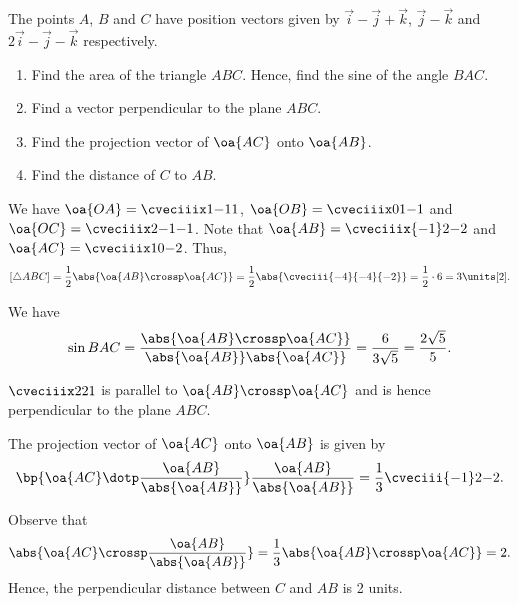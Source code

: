 \clearpage
\begin{problem}
    The points $A$, $B$ and $C$ have position vectors given by $\vec i - \vec j + \vec k$, $\vec j - \vec k$ and $2 \vec i - \vec j - \vec k$ respectively.

    \begin{enumerate}
        \item Find the area of the triangle $ABC$. Hence, find the sine of the angle $BAC$.
        \item Find a vector perpendicular to the plane $ABC$.
        \item Find the projection vector of $\oa{AC}$ onto $\oa{AB}$.
        \item Find the distance of $C$ to $AB$.
    \end{enumerate}
\end{problem}
\begin{solution}
    \begin{ppart}
        We have $\oa{OA} = \cveciiix1{-1}{1}$, $\oa{OB} = \cveciiix01{-1}$ and $\oa{OC} = \cveciiix2{-1}{-1}$. Note that $\oa{AB} = \cveciiix{-1}2{-2}$ and $\oa{AC} = \cveciiix10{-2}$. Thus, \[[\triangle ABC] = \frac12 \abs{\oa{AB} \crossp \oa{AC}} = \frac12 \abs{\cveciii{-4}{-4}{-2}} = \frac12 \cdot 6 = 3 \units[2].\]

        We have \[\sin BAC = \frac{\abs{\oa{AB} \crossp \oa{AC}}}{\abs{\oa{AB}}\abs{\oa{AC}}} = \frac{6}{3\sqrt5} = \frac{2\sqrt5}{5}.\]
    \end{ppart}
    \begin{ppart}
        $\cveciiix221$ is parallel to $\oa{AB} \crossp \oa{AC}$ and is hence perpendicular to the plane $ABC$.
    \end{ppart}
    \begin{ppart}
        The projection vector of $\oa{AC}$ onto $\oa{AB}$ is given by \[\bp{\oa{AC} \dotp \frac{\oa{AB}}{\abs{\oa{AB}}}} \frac{\oa{AB}}{\abs{\oa{AB}}} = \frac13 \cveciii{-1}2{-2}.\]
    \end{ppart}
    \begin{ppart}
        Observe that \[\abs{\oa{AC} \crossp \frac{\oa{AB}}{\abs{\oa{AB}}}} = \frac13 \abs{\oa{AB} \crossp \oa{AC}} = 2.\] Hence, the perpendicular distance between $C$ and $AB$ is 2 units.
    \end{ppart}
\end{solution}

